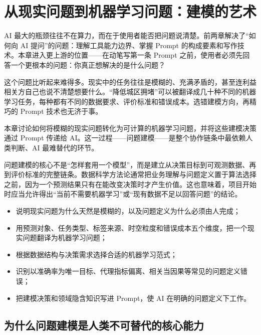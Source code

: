 ﻿\chapter{从现实问题到机器学习问题：建模的艺术}

AI 最大的瓶颈往往不在算力，而在于使用者能否把问题说清楚。前两章解决了“如何向 AI 提问”的问题：理解工具能力边界、掌握 Prompt 的构成要素和写作技术。本章进入更上游的位置——在动笔写第一条 Prompt 之前，使用者必须先回答一个更根本的问题：你真正想解决的是什么问题？

这个问题比听起来难得多。现实中的任务往往是模糊的、充满矛盾的，甚至连利益相关方自己也说不清楚想要什么。“降低城区拥堵”可以被翻译成几十种不同的机器学习任务，每种都有不同的数据要求、评价标准和错误成本。选错建模方向，再精巧的 Prompt 技术也无济于事。

本章讨论如何将模糊的现实问题转化为可计算的机器学习问题，并将这些建模决策通过 Prompt 传递给 AI。这一过程——问题建模——是整个协作链条中最依赖人类判断、AI 最难替代的环节。

问题建模的核心不是“怎样套用一个模型”，而是建立从决策目标到可观测数据、再到评价标准的完整链条。数据科学方法论通常把业务理解与问题定义置于算法选择之前，因为一个预测结果只有在能改变决策时才产生价值\cite{provost2013data}。这也意味着，项目开始时应当允许得出“当前不需要机器学习”或“现有数据不足以回答问题”的结论。

\begin{chapterguide}
\begin{itemize}
  \item 说明现实问题为什么天然是模糊的，以及问题定义为什么必须由人完成；
  \item 用预测对象、任务类型、标签来源、时空粒度和错误成本五个维度，把一个现实问题翻译为机器学习问题；
  \item 根据数据结构与决策需求选择合适的机器学习范式；
  \item 识别以准确率为唯一目标、代理指标偏离、相关当因果等常见的问题定义错误；
  \item 把建模决策和领域隐含知识写进 Prompt，使 AI 在明确的问题定义下工作。
\end{itemize}
\end{chapterguide}

\section{为什么问题建模是人类不可替代的核心能力}
\label{sec:why_modeling_hard}


